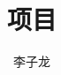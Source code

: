\documentclass[UTF8,12pt,a4paper]{ctexart}
\author{李子龙}
\theoremstyle{definition}\newtheorem{problem}{问题}
\theoremstyle{plain}\newtheorem*{solution}{Solution}
\begin{document}
    \title{项目}
    \maketitle
\end{document}
